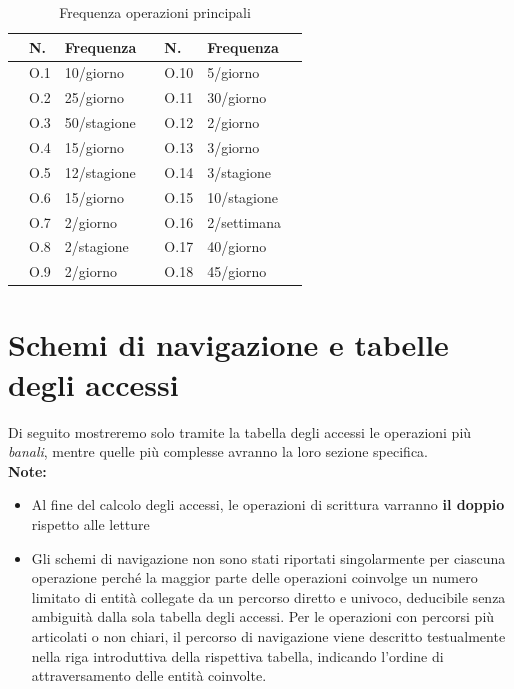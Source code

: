 \begin{table}[H]
  \centering
  \caption{Frequenza operazioni principali}
  \label{tab:operazioni}
  \begin{tabularx}{\textwidth}{C{2cm} C{0.6cm} C{2.8cm} C{2cm} C{0.6cm} C{3.05cm} C{2cm}}
  \toprule
  & \textbf{N.} & \textbf{Frequenza} & & \textbf{N.} & \textbf{Frequenza} & \\
  \midrule
   & O.1 & 10/giorno     & & O.10 & 5/giorno     & \\
   & O.2 & 25/giorno     & & O.11 & 30/giorno    & \\
   & O.3 & 50/stagione   & & O.12 & 2/giorno     & \\
   & O.4 & 15/giorno     & & O.13 & 3/giorno     & \\
   & O.5 & 12/stagione   & & O.14 & 3/stagione   & \\
   & O.6 & 15/giorno     & & O.15 & 10/stagione  & \\
   & O.7 & 2/giorno      & & O.16 & 2/settimana  & \\
   & O.8 & 2/stagione    & & O.17 & 40/giorno    & \\
   & O.9 & 2/giorno      & & O.18 & 45/giorno    & \\
  \bottomrule
  \end{tabularx}
\end{table}

\clearpage

\section{Schemi di navigazione e tabelle degli accessi}

Di seguito mostreremo solo tramite la tabella degli accessi le operazioni più \textit{banali}, 
mentre quelle più complesse avranno la loro sezione specifica. \\
\textbf{Note:}
\begin{itemize}
  \item Al fine del calcolo degli accessi, le operazioni di scrittura varranno \textbf{il doppio} rispetto alle letture
  \item Gli schemi di navigazione non sono stati riportati singolarmente per ciascuna operazione perch\'{e} la maggior parte delle operazioni coinvolge un numero limitato di entità 
  collegate da un percorso diretto e univoco, deducibile senza ambiguità dalla sola tabella degli accessi. Per le operazioni con percorsi più articolati o non chiari, 
  il percorso di navigazione viene descritto testualmente nella riga introduttiva della rispettiva tabella, indicando l'ordine di attraversamento delle entità coinvolte.
\end{itemize} 

